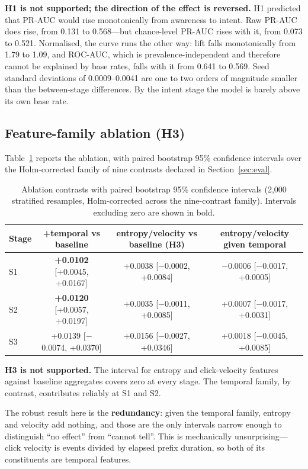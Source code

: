 \documentclass[review,3p,times,authoryear]{elsarticle}   %
\begin{document}
\textbf{H1 is not supported; the direction of the effect is reversed.} H1 predicted
that PR-AUC would rise monotonically from awareness to intent. Raw PR-AUC does
rise, from 0.131 to 0.568---but chance-level PR-AUC rises with it, from 0.073 to
0.521. Normalised, the curve runs the other way: lift falls monotonically from 1.79
to 1.09, and ROC-AUC, which is prevalence-independent and therefore cannot be
explained by base rates, falls with it from 0.641 to 0.569. Seed standard
deviations of 0.0009--0.0041 are one to two orders of magnitude smaller than the
between-stage differences. By the intent stage the model is barely above its own
base rate.

\subsection{Feature-family ablation (H3)}

Table~\ref{tab:ablation} reports the ablation, with paired bootstrap 95\%
confidence intervals over the Holm-corrected family of nine contrasts declared in
Section~\ref{sec:eval}.

\begin{table}[t]
\centering
\caption{Ablation contrasts with paired bootstrap 95\% confidence intervals
(2,000 stratified resamples, Holm-corrected across the nine-contrast family).
Intervals excluding zero are shown in bold.}
\label{tab:ablation}
\small
\begin{tabular}{@{}lccc@{}}
\toprule
\textbf{Stage} & \textbf{+temporal vs baseline} &
\textbf{entropy/velocity vs baseline (H3)} &
\textbf{entropy/velocity given temporal} \\
\midrule
S1 & \textbf{+0.0102} [+0.0045, +0.0167] & +0.0038 [$-$0.0002, +0.0084] & $-$0.0006 [$-$0.0017, +0.0005] \\
S2 & \textbf{+0.0120} [+0.0057, +0.0197] & +0.0035 [$-$0.0011, +0.0085] & +0.0007 [$-$0.0017, +0.0031] \\
S3 & +0.0139 [$-$0.0074, +0.0370]        & +0.0156 [$-$0.0027, +0.0346] & +0.0018 [$-$0.0045, +0.0085] \\
\bottomrule
\end{tabular}
\end{table}

\textbf{H3 is not supported.} The interval for entropy and click-velocity features
against baseline aggregates covers zero at every stage. The temporal family, by
contrast, contributes reliably at S1 and S2.

The robust result here is the \textbf{redundancy}: given the temporal family,
entropy and velocity add nothing, and those are the only intervals narrow enough to
distinguish ``no effect'' from ``cannot tell''. This is mechanically unsurprising---
click velocity is events divided by elapsed prefix duration, so both of its
constituents are temporal features.
\end{document}
